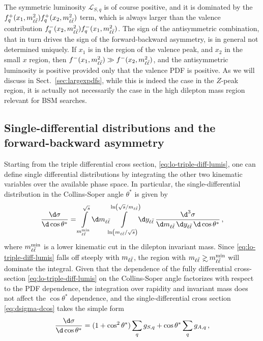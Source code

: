 The symmetric luminosity $\mathcal{L}_{S,q}$ is of course positive,
and it is
dominated by the $f_q^+(x_1,m_{\ell\bar{\ell}}^2) f_{q}^+(x_2,m_{\ell\bar{\ell}}^2)$ term, which
is always larger than the valence contribution 
$f_q^-(x_2,m_{\ell\bar{\ell}}^2) f_{q}^-(x_1,m_{\ell\bar{\ell}}^2)$.
The sign of the antisymmetric combination, that in turn
drives the sign of the
forward-backward asymmetry, is in general not determined
uniquely.
%
If $x_1$ is in the region of the valence peak, and $x_2$ in
the small $x$ region, then $f^-(x_1,m_{\ell\bar{\ell}}^2)\gg f^-(x_2,m_{\ell\bar{\ell}}^2)$, and the
antisymmetric luminosity is positive provided only that the valence PDF is positive.
%
As we will discuss in Sect.~\ref{sec:largexpdfs},
while this is indeed the case in
the $Z$-peak region, it is actually not necessarily the case in the
high dilepton mass region relevant for BSM searches.

\subsection{Single-differential distributions and the forward-backward asymmetry}
\label{sec:numlo}
Starting from the triple differential cross section,
\cref{eq:lo-triple-diff-lumis}, one can define 
single differential distributions by integrating the other two kinematic variables
over the available phase space.
%
In particular, the single-differential distribution in the
Collins-Soper angle $\theta^*$ is given by
\begin{equation}
  \label{eq:dsigma-dcos}
  \frac{\d\sigma}{\d\cos\theta^*} = \int\limits_{\mll^{\text{min}}}^{\sqrt s}\!\d\mll\!\!\int\limits_{\ln(\mll/\sqrt s)}^{\ln(\sqrt s/\mll)}\!\!\d\yll\, \frac{\d^3 \sigma}{\d \mll \, \d \yll \, \d\cos\theta^*} \, ,
\end{equation}
where $m_{\ell\bar{\ell}}^{\text{min}}$ is a lower kinematic cut in the dilepton invariant mass.
%
Since \cref{eq:lo-triple-diff-lumis} falls off steeply with $m_{\ell\bar{\ell}}$, the region
with $\mll \gsim \mll^{\text{min}}$ will dominate the integral.
%
Given that the dependence of the fully differential cross-section
\cref{eq:lo-triple-diff-lumis}
on  the Collins-Soper angle factorizes with respect to the PDF
dependence, the integration over rapidity and invariant mass does not
affect the  $\cos\theta^*$ dependence, and the single-differential
cross section \cref{eq:dsigma-dcos} takes the simple form 
\begin{equation}
  \label{eq:dsigma-dcos-v2}
  \frac{\d\sigma}{\d\cos\theta^*} = (1+\cos^2\theta^*)\sum_q g_{S,q} + \cos\theta^*\sum_q g_{A,q} \, ,
\end{equation}
